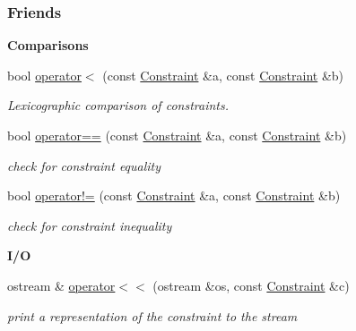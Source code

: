 \subsubsection*{Friends}
\begin{Indent}\textbf{ Comparisons}\par
\begin{DoxyCompactItemize}
\item 
bool \hyperlink{group___c_l_s_solvers_ad7246226080bd15a0d477cd905b4b71c}{operator$<$} (const \hyperlink{group___c_l_s_solvers_class_l_p___solvers_1_1_constraint}{Constraint} \&a, const \hyperlink{group___c_l_s_solvers_class_l_p___solvers_1_1_constraint}{Constraint} \&b)
\begin{DoxyCompactList}\small\item\em Lexicographic comparison of constraints. \end{DoxyCompactList}\item 
bool \hyperlink{group___c_l_s_solvers_a9411a8f6505608b523a4d5f28014d4c2}{operator==} (const \hyperlink{group___c_l_s_solvers_class_l_p___solvers_1_1_constraint}{Constraint} \&a, const \hyperlink{group___c_l_s_solvers_class_l_p___solvers_1_1_constraint}{Constraint} \&b)
\begin{DoxyCompactList}\small\item\em check for constraint equality \end{DoxyCompactList}\item 
bool \hyperlink{group___c_l_s_solvers_ab67011dc88bf8927d50bf3806e792f8b}{operator!=} (const \hyperlink{group___c_l_s_solvers_class_l_p___solvers_1_1_constraint}{Constraint} \&a, const \hyperlink{group___c_l_s_solvers_class_l_p___solvers_1_1_constraint}{Constraint} \&b)
\begin{DoxyCompactList}\small\item\em check for constraint inequality \end{DoxyCompactList}\end{DoxyCompactItemize}
\end{Indent}
\begin{Indent}\textbf{ I/O}\par
\begin{DoxyCompactItemize}
\item 
ostream \& \hyperlink{group___c_l_s_solvers_a7233f9b589a413e310991431039b05b6}{operator$<$$<$} (ostream \&os, const \hyperlink{group___c_l_s_solvers_class_l_p___solvers_1_1_constraint}{Constraint} \&c)
\begin{DoxyCompactList}\small\item\em print a representation of the constraint to the stream \end{DoxyCompactList}\end{DoxyCompactItemize}
\end{Indent}


